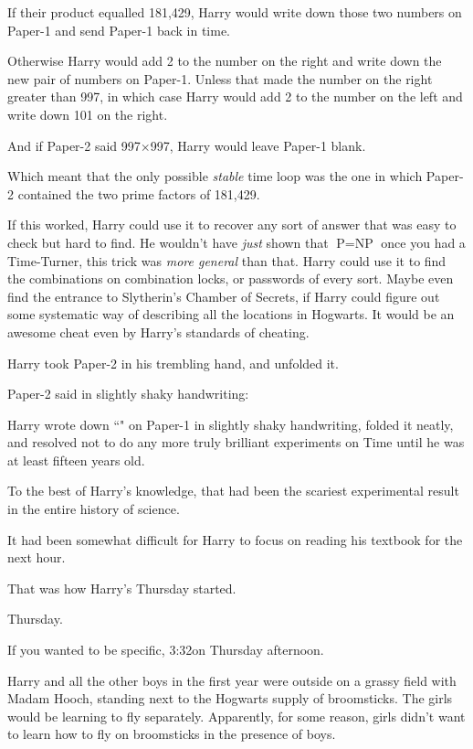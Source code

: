If their product equalled 181,429, Harry would write down those two numbers on Paper-1 and send Paper-1 back in time.

Otherwise Harry would add 2 to the number on the right and write down the new pair of numbers on Paper-1. Unless that made the number on the right greater than 997, in which case Harry would add 2 to the number on the left and write down 101 on the right.

And if Paper-2 said 997$\times$997, Harry would leave Paper-1 blank.

Which meant that the only possible \emph{stable} time loop was the one in which Paper-2 contained the two prime factors of 181,429.

If this worked, Harry could use it to recover any sort of answer that was easy to check but hard to find. He wouldn't have \emph{just} shown that $\mbox{P}=\mbox{NP}$ once you had a Time-Turner, this trick was \emph{more general} than that. Harry could use it to find the combinations on combination locks, or passwords of every sort. Maybe even find the entrance to Slytherin's Chamber of Secrets, if Harry could figure out some systematic way of describing all the locations in Hogwarts. It would be an awesome cheat even by Harry's standards of cheating.

Harry took Paper-2 in his trembling hand, and unfolded it.

Paper-2 said in slightly shaky handwriting:


Harry wrote down ``" on Paper-1 in slightly shaky handwriting, folded it neatly, and resolved not to do any more truly brilliant experiments on Time until he was at least fifteen years old.

To the best of Harry's knowledge, that had been the scariest experimental result in the entire history of science.

It had been somewhat difficult for Harry to focus on reading his textbook for the next hour.

That was how Harry's Thursday started.

\later

Thursday.

If you wanted to be specific, 3:32\pm on Thursday afternoon.

Harry and all the other boys in the first year were outside on a grassy field with Madam Hooch, standing next to the Hogwarts supply of broomsticks. The girls would be learning to fly separately. Apparently, for some reason, girls didn't want to learn how to fly on broomsticks in the presence of boys.

